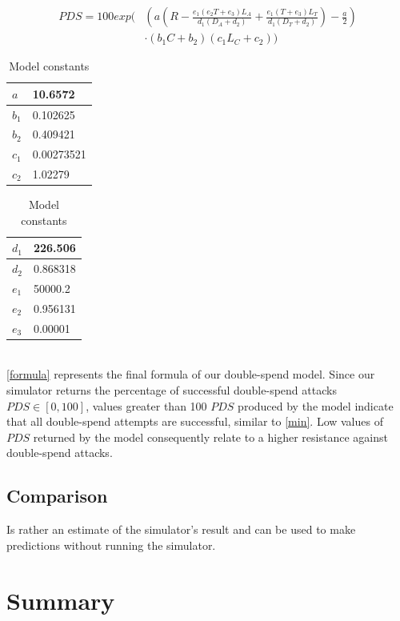 \documentclass[a4paper,12pt,twoside]{report}
\begin{document}
\begin{equation}\label{formula}
\begin{split}
PDS = 100 exp \Biggl( & \left( a \left( R-\frac{e_1 \left( e_2T+e_3 \right) L_A}{d_1 \left( D_A+d_2 \right)}+\frac{e_1 \left( T+e_3 \right) L_T}{d_1 \left( D_T+d_2 \right)} \right) - \frac{a}{2} \right) \\
           & \cdot \left( b_1C+b_2 \right) \left( c_1L_C+c_2 \right) \Biggr)
\end{split}
\end{equation}
\begin{table}[hb!]
\centering
\begin{tabular}{|l|l|} \hline
$a$ & 10.6572 \\ \hline
$b_1$ & 0.102625 \\ \hline
$b_2$ & 0.409421 \\ \hline
$c_1$ & 0.00273521 \\ \hline
$c_2$ & 1.02279 \\ \hline
\end{tabular}
\begin{tabular}{|l|l|} \hline
$d_1$ & 226.506 \\ \hline
$d_2$ & 0.868318 \\ \hline
$e_1$ & 50000.2 \\ \hline
$e_2$ & 0.956131 \\ \hline
$e_3$ & 0.00001 \\ \hline
\end{tabular}
\caption{Model constants}
\label{constants}
\end{table}
\\
\autoref{formula} represents the final formula of our double-spend model. Since our simulator returns the percentage of successful double-spend attacks $PDS \in [0, 100]$, values greater than 100 $PDS$ produced by the model indicate that all double-spend attempts are successful, similar to \autoref{min}. Low values of $PDS$ returned by the model consequently relate to a higher resistance against double-spend attacks.
\section{Comparison}
Is rather an estimate of the simulator's result and can be used to make predictions without running the simulator. 


\chapter{Summary}
\end{document}

